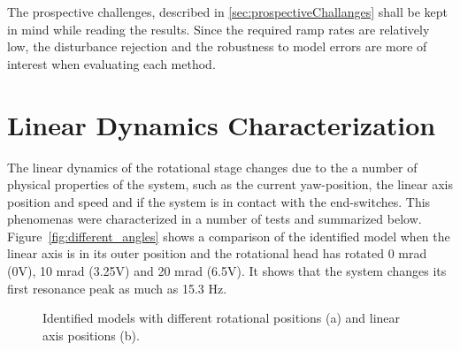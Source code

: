The prospective challenges, described in \ref{sec:prospectiveChallanges} shall be kept in mind while reading the results. Since the required ramp rates are relatively low, the disturbance rejection and the robustness to model errors are more of interest when evaluating each method.

\section{Linear Dynamics Characterization}
The linear dynamics of the rotational stage changes due to the a number of physical properties of the system, such as the current yaw-position, the linear axis position and speed and if the system is in contact with the end-switches. This phenomenas were characterized in a number of tests and summarized below. Figure~\ref{fig:different_angles} shows a comparison of the identified model when the linear axis is in its outer position and the rotational head has rotated 0 mrad (0V), 10 mrad (3.25V) and 20 mrad (6.5V). It shows that the system changes its first resonance peak as much as 15.3 Hz.

\begin{figure}[h!]
  \centering %
  \qquad
  \caption{\label{fig:different_lin_angle} Identified models with different rotational positions (a) and linear axis positions (b).}
\end{figure}

